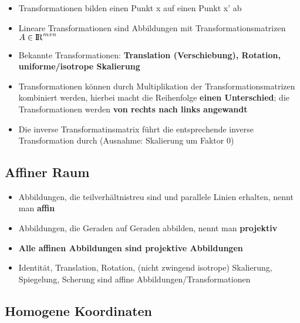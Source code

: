 \documentclass[10pt,a4paper]{article}
\def\realnumbers{{\rm I\!R}}
\begin{document}
	\begin{itemize}
		\item Transformationen bilden einen Punkt x auf einen Punkt x' ab
		\item Lineare Transformationen sind Abbildungen mit Transformationsmatrizen $A \in \realnumbers^{mxn}$
		\item Bekannte Transformationen: \textbf{Translation (Verschiebung), Rotation, uniforme/isotrope Skalierung}
		\item Transformationen können durch Multiplikation der Transformationsmatrizen kombiniert werden, hierbei macht die Reihenfolge \textbf{einen Unterschied}; die Transformationen werden \textbf{von rechts nach links angewandt}
		\item Die inverse Transformatinsmatrix führt die entsprechende inverse Transformation durch (Ausnahme: Skalierung um Faktor 0)
	\end{itemize}

	\subsection{Affiner Raum}
	\label{tf:sub:affiner_raum}

	\begin{itemize}
		\item Abbildungen, die teilverhältnistreu sind und parallele Linien erhalten, nennt man \textbf{affin}
		\item Abbildungen, die Geraden auf Geraden abbilden, nennt man \textbf{projektiv}
		\item \textbf{Alle affinen Abbildungen sind projektive Abbildungen}
		\item Identität, Translation, Rotation, (nicht zwingend isotrope) Skalierung, Spiegelung, Scherung sind affine Abbildungen/Transformationen
	\end{itemize}

	\subsection{Homogene Koordinaten}
	\label{tf:sub:homogene_koordinaten}
	
\end{document}
